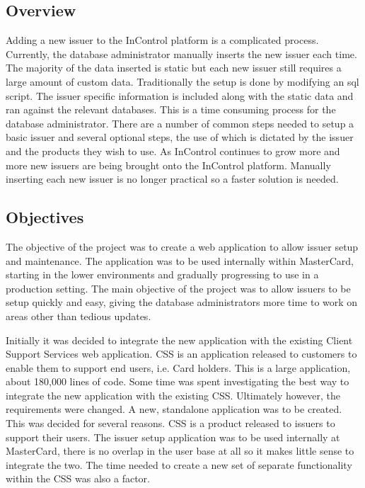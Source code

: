 \documentclass[a4paper, 11pt, titlepage]{article}
\begin{document}
\subsection{Overview} 
Adding a new issuer to the InControl platform is a complicated process. Currently, the database administrator manually inserts the new issuer each time. The majority of the data inserted is static but each new issuer still requires a large amount of custom data. Traditionally the setup is done by modifying an sql script. The issuer specific information is included along with the static data and ran against the relevant databases. This is a time consuming process for the database administrator. There are a number of common steps needed to setup a basic issuer and several optional steps, the use of which is dictated by the issuer and the products they wish to use. As InControl continues to grow more and more new issuers are being brought onto the InControl platform. Manually inserting each new issuer is no longer practical so a faster solution is needed. 
 
  
 
\subsection{Objectives} 
 
The objective of the project was to create a web application to allow issuer setup and maintenance. The application was to be used internally within MasterCard, starting in the lower environments and gradually progressing to use in a production setting. The main objective of the project was to allow issuers to be setup quickly and easy, giving the database administrators more time to work on areas other than tedious updates. 
 
Initially it was decided to integrate the new application with the existing Client Support Services web application. CSS is an application released to customers to enable them to support end users, i.e. Card holders. This is a large application, about 180,000 lines of code. Some time was spent investigating the best way to integrate the new application with the existing CSS. Ultimately however, the requirements were changed. A new, standalone application was to be created. This was decided for several reasons. CSS is a product released to issuers to support their users. The issuer setup application was to be used internally at MasterCard, there is no overlap in the user base at all so it makes little sense to integrate the two. The time needed to create a new set of separate functionality within the CSS was also a factor. 
 
\end{document}
